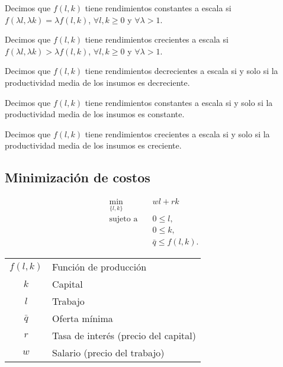 \documentclass[8pt,a4paper]{extarticle}
\begin{document}
\begin{multicols}{3}
	\begin{boxtheo}
		Decimos que $f(l, k)$ tiene rendimientos constantes a escala si $f(\lambda l, \lambda k) = \lambda f(l, k)$,\; $\forall l, k \ge 0$ y $\forall \lambda > 1$.
	\end{boxtheo}

	\begin{boxtheo}
		Decimos que $f(l, k)$ tiene rendimientos crecientes a escala si $f(\lambda l, \lambda k) > \lambda f(l, k)$,\; $\forall l, k \ge 0$ y $\forall \lambda > 1$.
	\end{boxtheo}

	\sectionbreak

	\begin{boxprop}
		Decimos que $f(l, k)$ tiene rendimientos decrecientes a escala si y solo si la productividad media de los insumos es decreciente.
	\end{boxprop}

	\begin{boxprop}
		Decimos que $f(l, k)$ tiene rendimientos constantes a escala si y solo si la productividad media de los insumos es constante.
	\end{boxprop}

	\begin{boxprop}
		Decimos que $f(l, k)$ tiene rendimientos crecientes a escala si y solo si la productividad media de los insumos es creciente.
	\end{boxprop}

	\newpage

	\subsection{Minimización de costos}

	\begin{equation*}
		\begin{aligned}
			\min_{\{l, k\}}\      & wl + rk              \\
			\text{sujeto a} \quad & 0 \le l,             \\
			                      & 0 \le k,             \\
			                      & \bar{q} \le f(l, k).
		\end{aligned}
	\end{equation*}

	\begin{center}
		\begin{tabular}{ c l }
			\hline
			$f(l, k)$ & Función de producción                \\
			$k$       & Capital                              \\
			$l$       & Trabajo                              \\
			$\bar{q}$ & Oferta mínima                        \\
			$r$       & Tasa de interés (precio del capital) \\
			$w$       & Salario (precio del trabajo)         \\
			\hline
		\end{tabular}
	\end{center}


\end{multicols}
\end{document}

